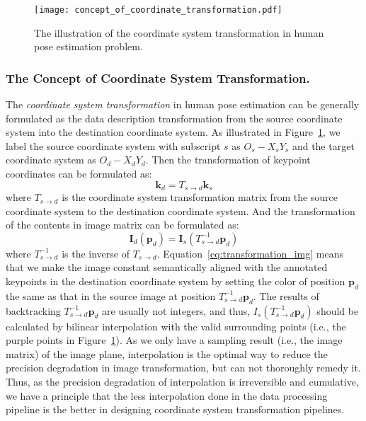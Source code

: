 \documentclass[10pt,journal,compsoc]{IEEEtran}
\begin{document}
\begin{figure}[h]
    \centering
    \texttt{[image: concept\_of\_coordinate\_transformation.pdf]}
    \caption{The illustration of the coordinate system transformation in human pose estimation problem. }
    \label{fig:concept_of_coordinate_transformation}
\end{figure}

\subsubsection{The Concept of Coordinate System Transformation.}
The \textit{coordinate system transformation} in human pose estimation can be generally formulated as the data description transformation from the source coordinate system into the destination coordinate system. As illustrated in Figure~\ref{fig:concept_of_coordinate_transformation}, we label the source coordinate system with subscript $s$ as $O_s-X_sY_s$ and the target coordinate system as $O_d-X_dY_d$. Then the transformation of keypoint coordinates can be formulated as:
\begin{equation}
\label{eq:transformation_kps}
    \textbf{k}_d = T_{s\rightarrow d}\textbf{k}_s
\end{equation}
where $T_{s\rightarrow d}$ is the coordinate system transformation matrix from the source coordinate system to the destination coordinate system. And the transformation of the contents in image matrix can be formulated as:
\begin{equation}
    \label{eq:transformation_img}
    \textbf{I}_d(\textbf{p}_d) = \textbf{I}_s(T_{s\rightarrow d}^{-1}\textbf{p}_d)
\end{equation}
where $T_{s\rightarrow d}^{-1}$ is the inverse of $T_{s\rightarrow d}$. Equation~\ref{eq:transformation_img} means that we make the image constant semantically aligned with the annotated keypoints in the destination coordinate system by setting the color of position $\textbf{p}_d$ the same as that in the source image at position $T_{s\rightarrow d}^{-1}\textbf{p}_d$. The results of backtracking $T_{s\rightarrow d}^{-1}\textbf{p}_d$ are usually not integers, and thus, $I_s(T_{s\rightarrow d}^{-1}\textbf{p}_d)$ should be calculated by bilinear interpolation with the valid surrounding points (i.e., the purple points in Figure~\ref{fig:concept_of_coordinate_transformation}). As we only have a sampling result (i.e., the image matrix) of the image plane, interpolation is the optimal way to reduce the precision degradation in image transformation, but can not thoroughly remedy it. Thus, as the precision degradation of interpolation is irreversible and cumulative, we have a principle that the less interpolation done in the data processing pipeline is the better in designing coordinate system transformation pipelines.
\end{document}
